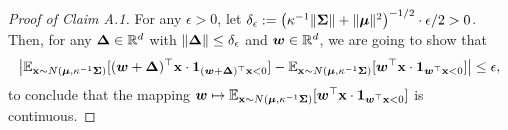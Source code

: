 \begin{proof}[Proof of Claim A.1]
For any $\epsilon >0$, let $\delta_\epsilon:= \left(\kappa^{-1} \lVert {\bm{\Sigma}} \rVert + \lVert {\bm{\mu}} \rVert^2 \right)^{-1/2} \cdot \epsilon /2 >0$. Then, for any ${\bm{\Delta}} \in \mathbb{R}^d$ with $\lVert {\bm{\Delta}} \rVert \leq \delta_\epsilon$ and ${\bm{w}} \in \mathbb{R}^d$, we are going to show that 
\begin{equation*}
\left | \mathbb{E}_{{\mathbf{x}} \sim N({\bm{\mu}}, \kappa^{-1} {\bm{\Sigma}})} [({\bm{w}}+{\bm{\Delta}})^\top {\mathbf{x}} \cdot {\bm{1}}_{({\bm{w}}+{\bm{\Delta}})^\top {\mathbf{x}}<0}]-\mathbb{E}_{{\mathbf{x}} \sim N({\bm{\mu}}, \kappa^{-1} {\bm{\Sigma}})} [{\bm{w}}^\top {\mathbf{x}} \cdot {\bm{1}}_{{\bm{w}}^\top {\mathbf{x}}<0}] \right | \leq \epsilon,
\end{equation*}
to conclude that the mapping ${\bm{w}} \mapsto \mathbb{E}_{{\mathbf{x}} \sim N({\bm{\mu}}, \kappa^{-1} {\bm{\Sigma}})} [{\bm{w}}^\top {\mathbf{x}} \cdot {\bm{1}}_{{\bm{w}}^\top {\mathbf{x}}<0}]$ is continuous.


\end{proof}
